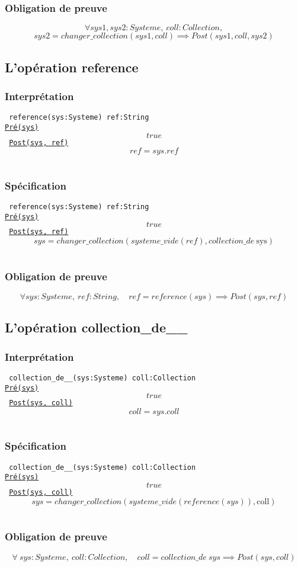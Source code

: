 \documentclass{article}
\begin{document}
\subsubsection{Obligation de preuve}
$$ \forall sys1,sys2:Systeme,\ coll:Collection,$$
$$ sys2 = changer\_collection(sys1, coll) \implies Post(sys1, coll, sys2)$$

\subsection{L'opération reference}
\subsubsection{Interprétation}
{\tt
reference(sys:Systeme) ref:String\\
\underline{Pré(sys)}
$$ true $$
\underline{Post(sys, ref)}
$$ ref = sys.ref $$
}

\subsubsection{Spécification}
{\tt
reference(sys:Systeme) ref:String\\
\underline{Pré(sys)}
$$ true $$
\underline{Post(sys, ref)}
$$ sys = changer\_collection(systeme\_vide(ref), collection\_de\ \text{sys}) $$
}

\subsubsection{Obligation de preuve}
$$ \forall sys:Systeme,\ ref:String,\quad ref = reference(sys) \implies Post(sys, ref) $$

\subsection{L'opération collection\_de\_\_}
\subsubsection{Interprétation}
{\tt
collection\_de\_\_(sys:Systeme) coll:Collection\\
\underline{Pré(sys)}
$$ true $$
\underline{Post(sys, coll)}
$$ coll = sys.coll $$
}

\subsubsection{Spécification}
{\tt
collection\_de\_\_(sys:Systeme) coll:Collection\\
\underline{Pré(sys)}
$$ true $$
\underline{Post(sys, coll)}
$$ sys = changer\_collection(systeme\_vide(reference(sys)), \text{coll}) $$
}

\subsubsection{Obligation de preuve}
$$ \forall\ sys:Systeme,\ coll:Collection,\quad coll = collection\_de\ sys \implies Post(sys, coll)$$



\end{document}
